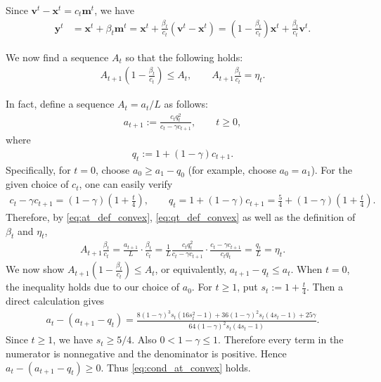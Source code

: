 \documentclass{article}
\theoremstyle{plain}
\theoremstyle{definition}
\theoremstyle{remark}
\begin{document}
Since \(\mathbf{v}^{t}-\mathbf{x}^{t}=c_t\mathbf{m}^{t}\), we have
\begin{align}
\mathbf{y}^{t}
&=
\mathbf{x}^{t}+\beta_t\mathbf{m}^{t} 
=
\mathbf{x}^{t}+\frac{\beta_t}{c_t}(\mathbf{v}^{t}-\mathbf{x}^{t}) 
=
\left(1-\frac{\beta_t}{c_t}\right)\mathbf{x}^{t}
+
\frac{\beta_t}{c_t}\mathbf{v}^{t}.
\end{align}

We now find a sequence $A_t$ so that the following holds:
\begin{align}\label{eq:cond_at_convex}
A_{t+1}\left(1-\frac{\beta_t}{c_t}\right)\le A_t,
\qquad
A_{t+1}\frac{\beta_t}{c_t}=\eta_t.
\end{align}

In fact, define a sequence \(A_t=a_t/L\) as follows:
\begin{align}\label{eq:at_def_convex}
a_{t+1}:=\frac{c_tq_t^2}{c_t-\gamma c_{t+1}},
\qquad t\ge 0,
\end{align}
where \begin{align}\label{eq:qt_def_convex}
q_t:=1+(1-\gamma)c_{t+1}.
\end{align}
Specifically, for $t=0$, choose \(a_0\ge a_1-q_0\) (for example, choose $a_0=a_1$). For the given choice of \(c_t\), one can easily verify
\begin{align}
c_t-\gamma c_{t+1}
=
(1-\gamma)\left(1+\frac{t}{4}\right),
\qquad
q_t
=
1+(1-\gamma)c_{t+1}
=
\frac54+(1-\gamma)\left(1+\frac{t}{4}\right).
\end{align}
Therefore, by \eqref{eq:at_def_convex}, \eqref{eq:qt_def_convex} as well as the definition of $\beta_t$ and $\eta_t$,
\begin{align}
A_{t+1}\frac{\beta_t}{c_t}
=
\frac{a_{t+1}}{L}\cdot \frac{\beta_t}{c_t} 
=
\frac{1}{L}
\frac{c_tq_t^2}{c_t-\gamma c_{t+1}}
\cdot
\frac{c_t-\gamma c_{t+1}}{c_t q_t}
=
\frac{q_t}{L} 
=
\eta_t.
\end{align}
We now show $A_{t+1}\left(1-\frac{\beta_t}{c_t}\right)\le A_t$, or equivalently, $a_{t+1}-q_t\le a_t$. When $t=0$, the inequality holds due to our choice of $a_0$. For \(t\ge 1\), put $s_t:=1+\frac{t}{4}$. Then a direct calculation gives
\begin{align}
a_t-(a_{t+1}-q_t)
=
\frac{
8(1-\gamma)^3 s_t(16s_t^2-1)
+
36(1-\gamma)^2 s_t(4s_t-1)
+
25\gamma
}{
64(1-\gamma)^2 s_t(4s_t-1)
}.
\end{align}
Since \(t\ge 1\), we have \(s_t\ge 5/4\). Also \(0<1-\gamma\le 1\).
Therefore every term in the numerator is nonnegative and the denominator is
positive. Hence $a_t-(a_{t+1}-q_t)\ge 0$. Thus \eqref{eq:cond_at_convex} holds.
\end{document}
